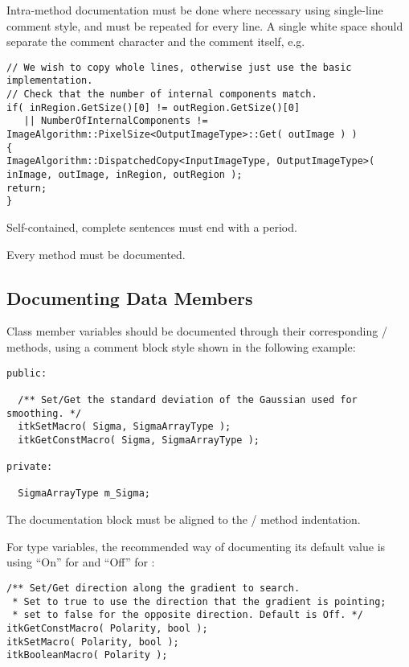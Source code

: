 Intra-method documentation must be done where necessary using single-line comment
style, and must be repeated for every line. A single white space should separate
the comment character \code{//} and the comment itself, e.g.

\small
\begin{verbatim}
// We wish to copy whole lines, otherwise just use the basic implementation.
// Check that the number of internal components match.
if( inRegion.GetSize()[0] != outRegion.GetSize()[0]
   || NumberOfInternalComponents != ImageAlgorithm::PixelSize<OutputImageType>::Get( outImage ) )
{
ImageAlgorithm::DispatchedCopy<InputImageType, OutputImageType>( inImage, outImage, inRegion, outRegion );
return;
}
\end{verbatim}
\normalsize

Self-contained, complete sentences must end with a period.

Every method must be documented.


\subsection{Documenting Data Members}
\label{subsec:DocumentingDataMembers}

Class member variables should be documented through their corresponding
/ methods, using a comment block style shown in
the following example:

\small
\begin{verbatim}
public:

  /** Set/Get the standard deviation of the Gaussian used for smoothing. */
  itkSetMacro( Sigma, SigmaArrayType );
  itkGetConstMacro( Sigma, SigmaArrayType );

private:

  SigmaArrayType m_Sigma;

\end{verbatim}
\normalsize

The documentation block must be aligned to the /
method indentation.

For  type variables, the recommended way of documenting its default
value is using ``On'' for  and ``Off'' for :

\small
\begin{verbatim}
/** Set/Get direction along the gradient to search.
 * Set to true to use the direction that the gradient is pointing;
 * set to false for the opposite direction. Default is Off. */
itkGetConstMacro( Polarity, bool );
itkSetMacro( Polarity, bool );
itkBooleanMacro( Polarity );
\end{verbatim}
\normalsize

